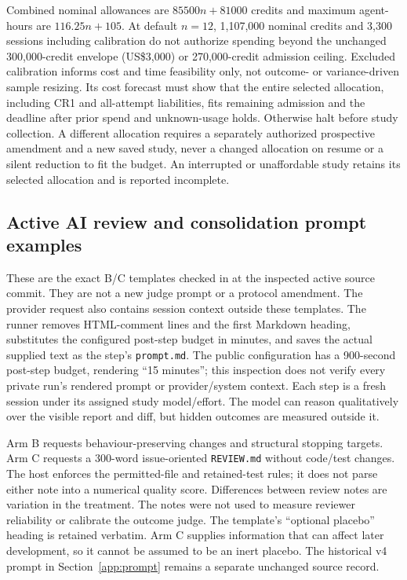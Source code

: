 Combined nominal allowances are $85500n+81000$ credits and maximum
agent-hours are $116.25n+105$. At default $n=12$, 1,107,000 nominal credits
and 3,300 sessions including calibration do not authorize spending beyond
the unchanged 300,000-credit envelope (US\$3,000) or 270,000-credit admission ceiling.
Excluded calibration informs cost and time feasibility only, not outcome-
or variance-driven sample resizing. Its cost forecast must show that the
entire selected allocation, including CR1 and all-attempt liabilities, fits
remaining admission and the deadline after prior spend and unknown-usage
holds. Otherwise halt before study collection. A different allocation
requires a separately authorized prospective amendment and a new saved
study, never a changed allocation on resume or a silent reduction to fit
the budget. An interrupted or unaffordable study retains its selected
allocation and is reported incomplete.

\FloatBarrier
\subsection{Active AI review and consolidation prompt examples}\label{app:activeprompts}

These are the exact B/C templates checked in at the inspected active
source commit. They are not a new judge prompt or a protocol amendment.
The provider request also contains session context outside these templates. The runner removes HTML-comment lines and the first
Markdown heading, substitutes the configured post-step budget in minutes,
and saves the actual supplied text as the step's \texttt{prompt.md}.
The public configuration has a 900-second post-step budget, rendering
\textquotedblleft{}15 minutes\textquotedblright{}; this inspection does not verify every private run's rendered
prompt or provider/system context. Each step is a fresh session under its
assigned study model/effort. The model can reason qualitatively over the
visible report and diff, but hidden outcomes are measured outside it.

Arm B requests behaviour-preserving changes and structural stopping
targets. Arm C requests a 300-word issue-oriented \texttt{REVIEW.md}
without code/test changes. The host enforces the permitted-file and
retained-test rules; it does not parse either note into a numerical quality
score. Differences between review notes are variation in the treatment.
The notes were not used to measure reviewer reliability or calibrate the
outcome judge.
The template's ``optional placebo'' heading is retained verbatim.
Arm C supplies information that can affect later development, so it
cannot be assumed to be an inert placebo.
The historical v4 prompt in Section~\ref{app:prompt} remains a separate
unchanged source record.

